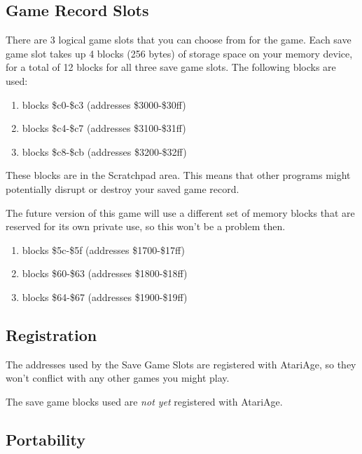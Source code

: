 \documentclass[10pt,twocolumn,openany,article]{memoir}
\begin{document}
\begin{description}
\section{Game Record Slots}

There are 3  logical game slots that  you can choose from  for the game.
Each save game  slot takes up 4  blocks (256 bytes) of  storage space on
your memory  device, for a  total of 12 blocks  for all three  save game
slots. The following blocks are used:

\ifdefined\DEMO

\begin{enumerate}
\item blocks \$c0-\$c3 (addresses \$3000-\$30ff)
\item blocks \$c4-\$c7 (addresses \$3100-\$31ff)
\item blocks \$c8-\$cb (addresses \$3200-\$32ff)
\end{enumerate}

These blocks are in the Scratchpad  area. This means that other programs
might potentially disrupt or destroy your saved game record.

The  future version  of this  game will  use a  different set  of memory
blocks  that are  reserved for  its own  private use,  so this  won't be
a problem then.

\else

\begin{enumerate}
\item blocks \$5c-\$5f (addresses \$1700-\$17ff)
\item blocks \$60-\$63 (addresses \$1800-\$18ff)
\item blocks \$64-\$67 (addresses \$1900-\$19ff)
\end{enumerate}

\subsection{Registration}

\ifdefined\FIXMERegisterGameWithAtariAge

The addresses used by the Save  Game Slots are registered with AtariAge,
so they won't conflict with any other games you might play.

\else

The save game blocks used are \emph{not yet} registered with AtariAge.

\fi

\fi


\subsection{Portability}


\end{description}
\end{document}
